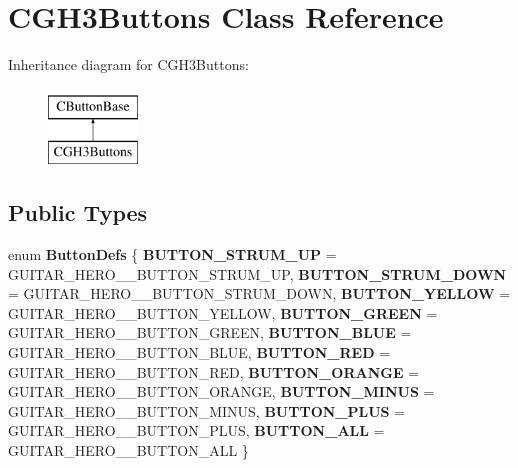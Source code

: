 \hypertarget{class_c_g_h3_buttons}{\section{\-C\-G\-H3\-Buttons \-Class \-Reference}
\label{class_c_g_h3_buttons}
}
\-Inheritance diagram for \-C\-G\-H3\-Buttons\-:\begin{figure}[H]
\begin{center}
\leavevmode
\includegraphics[height=2.000000cm]{class_c_g_h3_buttons}
\end{center}
\end{figure}
\subsection*{\-Public \-Types}
\begin{DoxyCompactItemize}
\item 
enum {\bfseries \-Button\-Defs} \{ \*
{\bfseries \-B\-U\-T\-T\-O\-N\-\_\-\-S\-T\-R\-U\-M\-\_\-\-U\-P} =  \-G\-U\-I\-T\-A\-R\-\_\-\-H\-E\-R\-O\-\_\-\_\-\-B\-U\-T\-T\-O\-N\-\_\-\-S\-T\-R\-U\-M\-\_\-\-U\-P, 
{\bfseries \-B\-U\-T\-T\-O\-N\-\_\-\-S\-T\-R\-U\-M\-\_\-\-D\-O\-W\-N} =  \-G\-U\-I\-T\-A\-R\-\_\-\-H\-E\-R\-O\-\_\-\_\-\-B\-U\-T\-T\-O\-N\-\_\-\-S\-T\-R\-U\-M\-\_\-\-D\-O\-W\-N, 
{\bfseries \-B\-U\-T\-T\-O\-N\-\_\-\-Y\-E\-L\-L\-O\-W} =  \-G\-U\-I\-T\-A\-R\-\_\-\-H\-E\-R\-O\-\_\-\_\-\-B\-U\-T\-T\-O\-N\-\_\-\-Y\-E\-L\-L\-O\-W, 
{\bfseries \-B\-U\-T\-T\-O\-N\-\_\-\-G\-R\-E\-E\-N} =  \-G\-U\-I\-T\-A\-R\-\_\-\-H\-E\-R\-O\-\_\-\_\-\-B\-U\-T\-T\-O\-N\-\_\-\-G\-R\-E\-E\-N, 
\*
{\bfseries \-B\-U\-T\-T\-O\-N\-\_\-\-B\-L\-U\-E} =  \-G\-U\-I\-T\-A\-R\-\_\-\-H\-E\-R\-O\-\_\-\_\-\-B\-U\-T\-T\-O\-N\-\_\-\-B\-L\-U\-E, 
{\bfseries \-B\-U\-T\-T\-O\-N\-\_\-\-R\-E\-D} =  \-G\-U\-I\-T\-A\-R\-\_\-\-H\-E\-R\-O\-\_\-\_\-\-B\-U\-T\-T\-O\-N\-\_\-\-R\-E\-D, 
{\bfseries \-B\-U\-T\-T\-O\-N\-\_\-\-O\-R\-A\-N\-G\-E} =  \-G\-U\-I\-T\-A\-R\-\_\-\-H\-E\-R\-O\-\_\-\_\-\-B\-U\-T\-T\-O\-N\-\_\-\-O\-R\-A\-N\-G\-E, 
{\bfseries \-B\-U\-T\-T\-O\-N\-\_\-\-M\-I\-N\-U\-S} =  \-G\-U\-I\-T\-A\-R\-\_\-\-H\-E\-R\-O\-\_\-\_\-\-B\-U\-T\-T\-O\-N\-\_\-\-M\-I\-N\-U\-S, 
\*
{\bfseries \-B\-U\-T\-T\-O\-N\-\_\-\-P\-L\-U\-S} =  \-G\-U\-I\-T\-A\-R\-\_\-\-H\-E\-R\-O\-\_\-\_\-\-B\-U\-T\-T\-O\-N\-\_\-\-P\-L\-U\-S, 
{\bfseries \-B\-U\-T\-T\-O\-N\-\_\-\-A\-L\-L} =  \-G\-U\-I\-T\-A\-R\-\_\-\-H\-E\-R\-O\-\_\-\_\-\-B\-U\-T\-T\-O\-N\-\_\-\-A\-L\-L
 \}
\end{DoxyCompactItemize}
